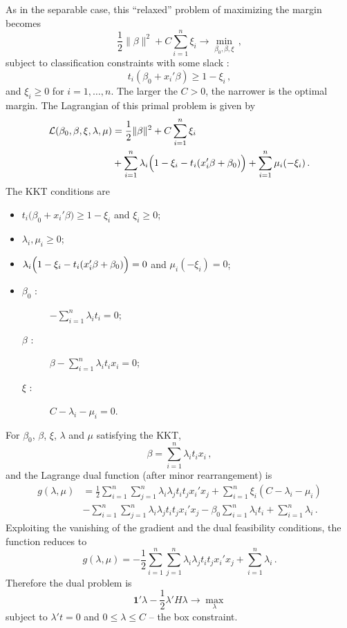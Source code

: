 \documentclass[a4paper]{article}
\newcommand{\one}{\mathbf{1}}
\newcommand{\Lcal}{\mathcal{L}}
\begin{document}
As in the separable case, this ``relaxed'' problem of maximizing the margin becomes
\[ \frac{1}{2} \|\beta\|^2 + C \sum_{i=1}^n \xi_i \to \min_{\beta_0,\beta, \xi}\,, \]
subject to classification constraints with some slack :
\[ t_i( \beta_0 + x_i'\beta ) \geq 1 - \xi_i \,, \]
and $\xi_i\geq 0$ for $i=1,\ldots,n$. The larger the $C>0$, the narrower is the optimal
margin. The Lagrangian of this primal problem is given by
\begin{align*}
	\Lcal(\beta_0,\beta,\xi, \lambda,\mu)
	&= \frac{1}{2} \|\beta\|^2 + C \sum_{i=1}^n \xi_i \\
	&+ \sum_{i=1}^n \lambda_i \Bigl( 1 - \xi_i - t_i ( x_i'\beta + \beta_0 ) \Bigr)
	+ \sum_{i=1}^n \mu_i ( - \xi_i )\,.
\end{align*}
The KKT conditions are \begin{itemize}
	\item $t_i \bigl( \beta_0 + x_i'\beta \bigr) \geq 1 - \xi_i$ and $\xi_i \geq 0$;
	\item $\lambda_i,\mu_i \geq 0$;
	\item $\lambda_i \Bigl( 1 - \xi_i - t_i ( x_i'\beta + \beta_0 ) \Bigr) = 0$
		and $\mu_i ( - \xi_i ) = 0$;
	\item \begin{description}
		\item[$\beta_0$ :] $ -\sum_{i=1}^n \lambda_i t_i = 0$;
		\item[$\beta$ :] $ \beta - \sum_{i=1}^n \lambda_i t_i x_i = 0$;
		\item[$\xi$ :] $ C - \lambda_i - \mu_i = 0$.
	\end{description}
\end{itemize}
For $\beta_0$, $\beta$, $\xi$, $\lambda$ and $\mu$ satisfying the KKT,
\[ \beta = \sum_{i=1}^n \lambda_i t_i x_i\,, \]
and the Lagrange dual function (after minor rearrangement) is
\begin{align*}
	g(\lambda,\mu)
	& = \frac{1}{2} \sum_{i=1}^n \sum_{j=1}^n \lambda_i \lambda_j t_i t_j x_i'x_j
		+ \sum_{i=1}^n \xi_i ( C - \lambda_i - \mu_i ) \\
	& - \sum_{i=1}^n \sum_{j=1}^n \lambda_i \lambda_j t_i t_j x_i'x_j
		- \beta_0 \sum_{i=1}^n \lambda_i t_i
		+ \sum_{i=1}^n \lambda_i \,.
\end{align*}
Exploiting the vanishing of the gradient and the dual feasibility conditions, the
function reduces to
\[
g(\lambda,\mu) =
- \frac{1}{2} \sum_{i=1}^n\sum_{j=1}^n \lambda_i\lambda_j t_i t_j x_i'x_j
+ \sum_{i=1}^n \lambda_i \,.
\]
Therefore the dual problem is
\[ \one' \lambda - \frac{1}{2}\lambda'H\lambda \to \max_\lambda \]
subject to $\lambda't = 0$ and $0\leq \lambda\leq C$ -- the box constraint.
\end{document}
